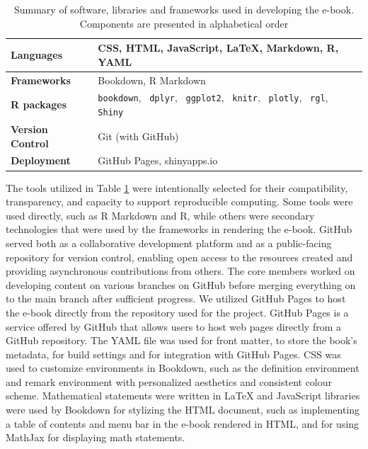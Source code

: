 \documentclass[11pt]{article}
\begin{document}
\renewcommand\arraystretch{1.20}
\begin{table}[H]
\setlength{\belowcaptionskip}{-25pt}
\begin{center}
\begin{tabular}{| l | l |}
\hline
\textbf{Languages}		&	CSS, HTML, JavaScript, LaTeX, Markdown, R, YAML\\
\hline
\textbf{Frameworks} 		&	Bookdown, R Markdown\\
\hline
\textbf{R packages}		&	\texttt{bookdown}, \, \texttt{dplyr}, \, \texttt{ggplot2}, \, \texttt{knitr}, \, \texttt{plotly}, \, \texttt{rgl}, \,\texttt{Shiny}\\
\hline
\textbf{Version Control} 	&	Git (with GitHub)\\
\hline
\textbf{Deployment} 		&	GitHub Pages, shinyapps.io\\
\hline
\end{tabular}
\caption{Summary of software, libraries and frameworks used in developing the e-book. Components are presented in alphabetical order}
\label{tab:ebook_Technologies}
\end{center}
\end{table}
\renewcommand\arraystretch{1.00}

The tools utilized in Table \ref{tab:ebook_Technologies} were intentionally selected for their compatibility, transparency, and capacity to support reproducible computing. 
Some tools were used directly, such as R Markdown and R, while others were secondary technologies that were used by the frameworks in rendering the e-book.
GitHub served both as a collaborative development platform and as a public-facing repository for version control, enabling open access to the resources created and providing asynchronous contributions from others.
The core members worked on developing content on various branches on GitHub before merging everything on to the main branch after sufficient progress.
We utilized GitHub Pages to host the e-book directly from the repository used for the project.
GitHub Pages is a service offered by GitHub that allows users to host web pages directly from a GitHub repository.
The YAML file was used for front matter, to store the book’s metadata, for build settings and for integration with GitHub Pages.
CSS was used to customize environments in Bookdown, such as the definition environment and remark environment with personalized aesthetics and consistent colour scheme.
Mathematical statements were written in LaTeX and JavaScript libraries were used by Bookdown for stylizing the HTML document, such as implementing a table of contents and menu bar in the e-book rendered in HTML, and for using MathJax for displaying math statements.
\end{document}
